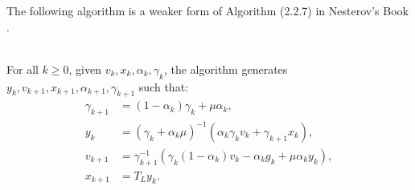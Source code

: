 \documentclass[12pt]{article}
\begin{document}
    The following algorithm is a weaker form of Algorithm (2.2.7) in Nesterov's Book \cite{nesterov_lectures_2018}. 
    \begin{definition}\label{def:weak-apg}\;\\
        For all $k \ge 0$, given $v_k, x_k, \alpha_k, \gamma_k$, the algorithm generates $y_k, v_{k + 1}, x_{k + 1}, \alpha_{k + 1},\gamma_{k + 1}$ such that: 
        \begin{align*}
            \gamma_{k + 1} &= (1 - \alpha_k)\gamma_k + \mu \alpha_k, 
            \\
            y_k &= 
            (\gamma_k + \alpha_k \mu)^{-1}(\alpha_k \gamma_k v_k + \gamma_{k + 1}x_k), 
            \\
            v_{k + 1} &= \gamma_{k + 1}^{-1}
            (\gamma_k(1 - \alpha_k) v_k - \alpha_k g_k + \mu \alpha_k y_k), 
            \\
            x_{k + 1} &= T_L y_k. 
        \end{align*}
    \end{definition}
\end{document}
